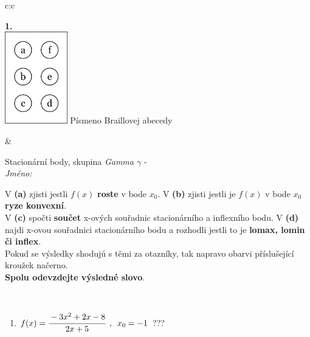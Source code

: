 \documentclass[10pt]{report}
\begin{document}
\begin{tabular}{c:c}
\begin{minipage}[c][104.5mm][t]{0.5\linewidth}
\begin{center}
\begin{minipage}{0.79\linewidth}
\end{minipage}
\begin{minipage}{0.20\linewidth}
\begin{center}
{\Huge\bfseries 1.} \\[2mm]
\includegraphics[height=40mm]{../images/braille.png}
{\small Písmeno Braillovej abecedy}
\end{center}
\end{minipage}
\end{center}
\end{minipage}
&
\begin{minipage}[c][104.5mm][t]{0.5\linewidth}
\begin{center}
\vspace{7mm}
{\huge Stacionární body, skupina \textit{Gamma $\gamma$} -}\\[5mm]
\textit{Jméno:}\phantom{xxxxxxxxxxxxxxxxxxxxxxxxxxxxxxxxxxxxxxxxxxxxxxxxxxxxxxxxxxxxxxxxx}\\[5mm]
\begin{minipage}{0.95\linewidth}
\begin{center}
{\small V \textbf{(a)} zjisti jestli $f(x)$ \textbf{roste} v bode $x_0$. V \textbf{(b)} zjisti jestli je $f(x)$ v bode $x_0$ \textbf{ryze konvexní}.\\V \textbf{(c)} spočti \textbf{součet} x-ových souřadnic stacionárního a inflexního bodu. V \textbf{(d)} najdi x-ovou souřadnici stacionárního bodu a rozhodli jestli to je \textbf{lomax, lomin či inflex}.\\Pokud se výsledky shodujú s těmi za otazníky, tak napravo obarvi příslušející kroužek načerno.\\\textbf{Spolu odevzdejte výsledné slovo}}.
\end{center}
\end{minipage}
\\[1mm]
\begin{minipage}{0.79\linewidth}
\begin{center}
\begin{varwidth}{\linewidth}
\begin{enumerate}
\normalsize
\item $f(x)=\cfrac{-3x^2+2x-8}{2x+5}\enspace , \enspace x_0=-1$\quad \dotfill\; ???\;\dotfill \quad {}

\end{enumerate}
\end{varwidth}
\end{center}
\end{minipage}
\end{center}
\end{minipage}
\end{tabular}
\end{document}
